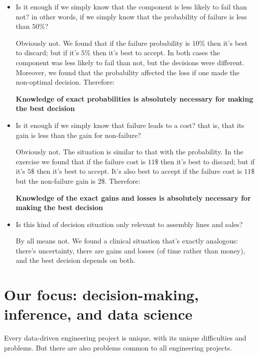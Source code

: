 \documentclass[
  a4paper,
  DIV=11,
  numbers=noendperiod,
  oneside]{scrreprt}
\begin{document}
\begin{itemize}
\item
  Is it enough if we simply know that the component is less likely to
  fail than not? in other words, if we simply know that the probability
  of failure is less than \(50\%\)?

  Obviously not. We found that if the failure probability is \(10\%\)
  then it's best to discard; but if it's \(5\%\) then it's best to
  accept. In both cases the component was less likely to fail than not,
  but the decisions were different. Moreover, we found that the
  probability affected the loss if one made the non-optimal decision.
  Therefore:

  {\textbf{Knowledge of exact probabilities is absolutely necessary for
  making the best decision}}
\item
  Is it enough if we simply know that failure leads to a cost? that is,
  that its gain is less than the gain for non-failure?

  Obviously not. The situation is similar to that with the probability.
  In the exercise we found that if the failure cost is \(11\$\) then
  it's best to discard; but if it's \(5\$\) then it's best to accept.
  It's also best to accept if the failure cost is \(11\$\) but the
  non-failure gain is \(2\$\). Therefore:

  {\textbf{Knowledge of the exact gains and losses is absolutely
  necessary for making the best decision}}
\item
  Is this kind of decision situation only relevant to assembly lines and
  sales?

  By all means not. We found a clinical situation that's exactly
  analogous: there's uncertainty, there are gains and losses (of time
  rather than money), and the best decision depends on both.
\end{itemize}

\hypertarget{our-focus-decision-making-inference-and-data-science}{%
\section{Our focus: decision-making, inference, and data
science}\label{our-focus-decision-making-inference-and-data-science}}

Every data-driven engineering project is unique, with its unique
difficulties and problems. But there are also problems common to all
engineering projects.
\end{document}

